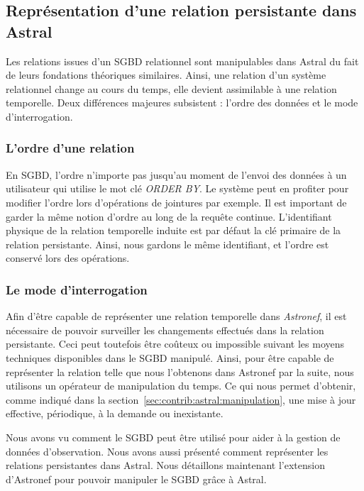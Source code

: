 \subsection{Représentation d'une relation persistante dans Astral}\label{sec:contrib:asteroid:theorie:astral}
Les relations issues d'un SGBD relationnel sont manipulables dans Astral du fait de leurs fondations théoriques similaires. Ainsi, une relation d'un système relationnel change au cours du temps, elle devient assimilable à une relation temporelle. Deux différences majeures subsistent : l'ordre des données et le mode d'interrogation.
\subsubsection{L'ordre d'une relation}
En SGBD, l'ordre n'importe pas jusqu'au moment de l'envoi des données à un utilisateur qui utilise le mot clé \textit{ORDER BY}. Le système peut en profiter pour modifier l'ordre lors d'opérations de jointures par exemple. Il est important de garder la même notion d'ordre au long de la requête continue. L'identifiant physique de la relation temporelle induite est par défaut la clé primaire de la relation persistante. Ainsi, nous gardons le même identifiant, et l'ordre est conservé lors des opérations.

\subsubsection{Le mode d'interrogation}
Afin d'être capable de représenter une relation temporelle dans \textit{Astronef}, il est nécessaire de pouvoir surveiller les changements effectués dans la relation persistante. Ceci peut toutefois être coûteux ou impossible suivant les moyens techniques disponibles dans le SGBD manipulé. Ainsi, pour être capable de représenter la relation telle que nous l'obtenons dans Astronef par la suite, nous utilisons un opérateur de manipulation du temps. Ce qui nous permet d'obtenir, comme indiqué dans la section~\ref{sec:contrib:astral:manipulation}, une mise à jour effective, périodique, à la demande ou inexistante.

Nous avons vu comment le SGBD peut être utilisé pour aider à la gestion de données d'observation. Nous avons aussi présenté comment représenter les relations persistantes dans Astral. Nous détaillons maintenant l'extension d'Astronef pour pouvoir manipuler le SGBD grâce à Astral.